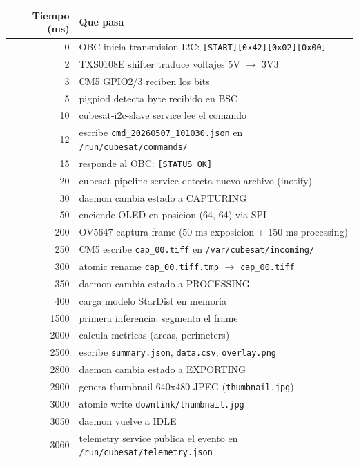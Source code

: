 \documentclass[11pt,a4paper,oneside,openright]{book}
\begin{document}
\begin{center}
\small
\begin{tabular}{rp{12cm}}
\toprule
\textbf{Tiempo (ms)} & \textbf{Que pasa} \\
\midrule
0     & OBC inicia transmision I2C: \texttt{[START][0x42][0x02][0x00]} \\
2     & TXS0108E shifter traduce voltajes 5V $\to$ 3V3 \\
3     & CM5 GPIO2/3 reciben los bits \\
5     & pigpiod detecta byte recibido en BSC \\
10    & cubesat-i2c-slave service lee el comando \\
12    & escribe \texttt{cmd\_20260507\_101030.json} en \texttt{/run/cubesat/commands/} \\
15    & responde al OBC: \texttt{[STATUS\_OK]} \\
20    & cubesat-pipeline service detecta nuevo archivo (inotify) \\
30    & daemon cambia estado a CAPTURING \\
50    & enciende OLED en posicion (64, 64) via SPI \\
200   & OV5647 captura frame (50 ms exposicion + 150 ms processing) \\
250   & CM5 escribe \texttt{cap\_00.tiff} en \texttt{/var/cubesat/incoming/} \\
300   & atomic rename \texttt{cap\_00.tiff.tmp} $\to$ \texttt{cap\_00.tiff} \\
350   & daemon cambia estado a PROCESSING \\
400   & carga modelo StarDist en memoria \\
1500  & primera inferencia: segmenta el frame \\
2000  & calcula metricas (areas, perimeters) \\
2500  & escribe \texttt{summary.json}, \texttt{data.csv}, \texttt{overlay.png} \\
2800  & daemon cambia estado a EXPORTING \\
2900  & genera thumbnail 640x480 JPEG (\texttt{thumbnail.jpg}) \\
3000  & atomic write \texttt{downlink/thumbnail.jpg} \\
3050  & daemon vuelve a IDLE \\
3060  & telemetry service publica el evento en \texttt{/run/cubesat/telemetry.json} \\
\bottomrule
\end{tabular}
\end{center}
\end{document}
